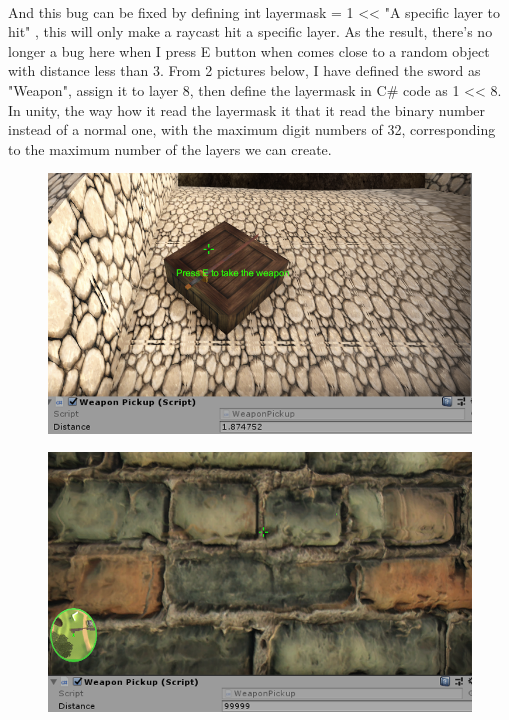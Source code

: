 \documentclass[a4paper, 13pt]{extarticle}
\begin{document}
{\begin{figure}[h]
\begin{minipage}{.5\textwidth}
			\label{fig:test40}
			\centering
		\end{minipage}
	\end{figure} \\
	And this bug can be fixed by defining int layermask = 1 << "A specific layer to hit" , this will only make a raycast hit a specific layer. As the result, there's no longer a bug here when I press E button when comes close to a random object with distance less than 3. From 2 pictures below, I have defined the sword as "Weapon", assign it to layer 8, then define the layermask in C\# code as 1 << 8. In unity, the way how it read the layermask it that it read the binary number instead of a normal one, with the maximum digit numbers of 32, corresponding to the maximum number of the layers we can create. 
	 \begin{figure}[h!]
	 	\begin{minipage}{.5\textwidth}
	 		\centering
	 		\includegraphics[width=1\linewidth]{intructions/it_works1.png}
	 		\label{fig:test41}
	 	\end{minipage}
 		\begin{minipage}{.5\textwidth}
 		\centering
 		\includegraphics[width=1\linewidth]{intructions/it_works2.png}

\end{minipage}
\end{figure}}
\end{document}
